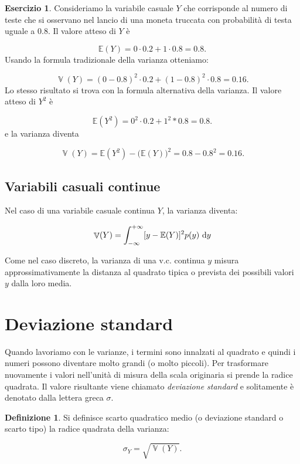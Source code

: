 \documentclass[
  11pt,
]{krantz}
\DeclareMathOperator{\Var}{\mathbb{V}} %
\newcommand{\E}{\mathbb{E}} %
\theoremstyle{definition}
\newtheorem{definition}{Definizione}[chapter]
\theoremstyle{definition}
\theoremstyle{definition}
\newtheorem{exercise}{Esercizio}[chapter]
\theoremstyle{definition}
\theoremstyle{remark}
\begin{document}
\begin{exercise}
Consideriamo la variabile casuale \(Y\) che corrisponde al numero di teste che si osservano nel lancio di una moneta truccata con probabilità di testa uguale a 0.8. Il valore atteso di \(Y\) è

\[
\E(Y) = 0 \cdot 0.2 + 1 \cdot 0.8 = 0.8.
\] Usando la formula tradizionale della varianza otteniamo:

\[
\Var(Y) = (0 - 0.8)^2 \cdot 0.2 + (1 - 0.8)^2 \cdot 0.8 = 0.16.
\] Lo stesso risultato si trova con la formula alternativa della varianza. Il valore atteso di \(Y^2\) è

\[
\E(Y^2) = 0^2 \cdot 0.2 + 1^2 * 0.8 = 0.8.
\] e la varianza diventa

\[
\Var(Y) = \E(Y^2) - \big(\E(Y) \big)^2 = 0.8 - 0.8^2 = 0.16.
\]
\end{exercise}

\hypertarget{variabili-casuali-continue-1}{%
\subsection{Variabili casuali continue}\label{variabili-casuali-continue-1}}

Nel caso di una variabile casuale continua \(Y\), la varianza diventa:

\begin{equation}
\Var(Y) = \int_{-\infty}^{+\infty} \large[y - \E(Y)\large]^2 p(y) \,\operatorname {d}\!y
\label{eq:def-var-rv-cont}
\end{equation}

Come nel caso discreto, la varianza di una v.c. continua \(y\) misura approssimativamente la distanza al quadrato tipica o prevista dei possibili valori \(y\) dalla loro media.

\hypertarget{deviazione-standard}{%
\section{Deviazione standard}\label{deviazione-standard}}

Quando lavoriamo con le varianze, i termini sono innalzati al quadrato e quindi i numeri possono diventare molto grandi (o molto piccoli). Per trasformare nuovamente i valori nell'unità di misura della scala originaria si prende la radice quadrata. Il valore risultante viene chiamato \emph{deviazione standard} e solitamente è denotato dalla lettera greca \(\sigma\).

\begin{definition}
Si definisce scarto quadratico medio (o deviazione standard o scarto tipo) la radice quadrata della varianza:

\begin{equation}
\sigma_Y = \sqrt{\Var(Y)}.
\label{eq:def-sd}
\end{equation}
\end{definition}
\end{document}
